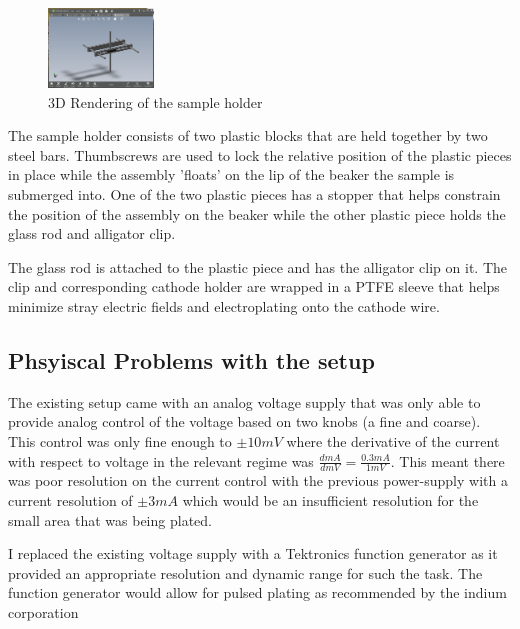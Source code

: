 \begin{figure}
    \centering
    \includegraphics[width=0.25\textwidth]{Main/Ch1/Sample_holder.png}
    \caption{3D Rendering of the sample holder}
\end{figure}

The sample holder consists of two plastic blocks that are held together by two steel bars. Thumbscrews are used to lock the relative position of the plastic pieces in place while the assembly 'floats'  on the lip of the beaker the sample is submerged into. One of the two plastic pieces has a stopper that helps constrain the position of the assembly on the beaker while the other plastic piece holds the glass rod and alligator clip.

The glass rod is attached to the plastic piece and has the alligator clip on it. The clip and corresponding cathode holder are wrapped in a PTFE sleeve that helps minimize stray electric fields and electroplating onto the cathode wire.



\subsection{Phsyiscal Problems with the setup}

The existing setup came with an analog voltage supply that was only able to provide analog control of the voltage based on two knobs (a fine and coarse). This control was only fine enough to $\pm 10mV$ where the derivative of the current with respect to voltage in the relevant regime was $\frac{d mA}{d mV} = \frac{0.3 mA}{1 mV}$.
This meant there was poor resolution on the current control with the previous power-supply with a current resolution of $\pm 3 mA$ which would be an insufficient resolution for the small area that was being plated.

I replaced the existing voltage supply with a Tektronics function generator as it provided an appropriate resolution and dynamic range for such the task.
The function generator would allow for pulsed plating as recommended by the indium corporation \cite{indiumCorpGrainStructure}

